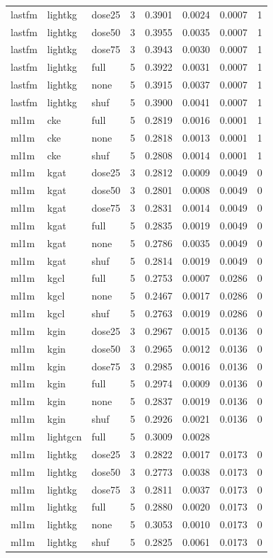 \begin{table}[t]
\begin{tabular}{llllllll}
lastfm & lightkg & dose25 & 3 & 0.3901 & 0.0024 & 0.0007 & 1 \\
lastfm & lightkg & dose50 & 3 & 0.3955 & 0.0035 & 0.0007 & 1 \\
lastfm & lightkg & dose75 & 3 & 0.3943 & 0.0030 & 0.0007 & 1 \\
lastfm & lightkg & full & 5 & 0.3922 & 0.0031 & 0.0007 & 1 \\
lastfm & lightkg & none & 5 & 0.3915 & 0.0037 & 0.0007 & 1 \\
lastfm & lightkg & shuf & 5 & 0.3900 & 0.0041 & 0.0007 & 1 \\
ml1m & cke & full & 5 & 0.2819 & 0.0016 & 0.0001 & 1 \\
ml1m & cke & none & 5 & 0.2818 & 0.0013 & 0.0001 & 1 \\
ml1m & cke & shuf & 5 & 0.2808 & 0.0014 & 0.0001 & 1 \\
ml1m & kgat & dose25 & 3 & 0.2812 & 0.0009 & 0.0049 & 0 \\
ml1m & kgat & dose50 & 3 & 0.2801 & 0.0008 & 0.0049 & 0 \\
ml1m & kgat & dose75 & 3 & 0.2831 & 0.0014 & 0.0049 & 0 \\
ml1m & kgat & full & 5 & 0.2835 & 0.0019 & 0.0049 & 0 \\
ml1m & kgat & none & 5 & 0.2786 & 0.0035 & 0.0049 & 0 \\
ml1m & kgat & shuf & 5 & 0.2814 & 0.0019 & 0.0049 & 0 \\
ml1m & kgcl & full & 5 & 0.2753 & 0.0007 & 0.0286 & 0 \\
ml1m & kgcl & none & 5 & 0.2467 & 0.0017 & 0.0286 & 0 \\
ml1m & kgcl & shuf & 5 & 0.2763 & 0.0019 & 0.0286 & 0 \\
ml1m & kgin & dose25 & 3 & 0.2967 & 0.0015 & 0.0136 & 0 \\
ml1m & kgin & dose50 & 3 & 0.2965 & 0.0012 & 0.0136 & 0 \\
ml1m & kgin & dose75 & 3 & 0.2985 & 0.0016 & 0.0136 & 0 \\
ml1m & kgin & full & 5 & 0.2974 & 0.0009 & 0.0136 & 0 \\
ml1m & kgin & none & 5 & 0.2837 & 0.0019 & 0.0136 & 0 \\
ml1m & kgin & shuf & 5 & 0.2926 & 0.0021 & 0.0136 & 0 \\
ml1m & lightgcn & full & 5 & 0.3009 & 0.0028 &  &  \\
ml1m & lightkg & dose25 & 3 & 0.2822 & 0.0017 & 0.0173 & 0 \\
ml1m & lightkg & dose50 & 3 & 0.2773 & 0.0038 & 0.0173 & 0 \\
ml1m & lightkg & dose75 & 3 & 0.2811 & 0.0037 & 0.0173 & 0 \\
ml1m & lightkg & full & 5 & 0.2880 & 0.0020 & 0.0173 & 0 \\
ml1m & lightkg & none & 5 & 0.3053 & 0.0010 & 0.0173 & 0 \\
ml1m & lightkg & shuf & 5 & 0.2825 & 0.0061 & 0.0173 & 0 \\
\hline
\end{tabular}
\end{table}
